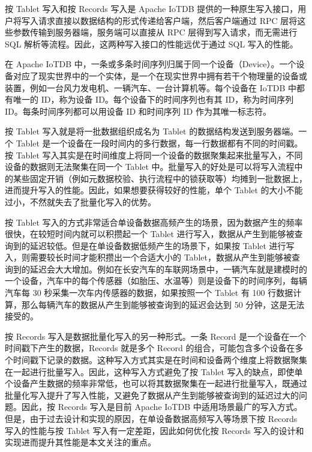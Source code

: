 按 Tablet 写入和按 Records 写入是 Apache IoTDB 提供的一种原生写入接口，用户将写入请求直接以数据结构的形式传递给客户端，然后客户端通过 RPC 层将这些参数传输到服务器端，服务端可以直接从 RPC 层得到写入请求，而无需进行 SQL 解析等流程。因此，这两种写入接口的性能远优于通过 SQL 写入的性能。

在 Apache IoTDB 中，一条或多条时间序列归属于同一个设备（Device）\cite{apache2024iotdbdevice}。一个设备对应了现实世界中的一个实体，是一个在现实世界中拥有若干个物理量的设备或装置，例如一台风力发电机、一辆汽车、一台计算机等。每个设备在 IoTDB 中都有唯一的 ID，称为设备 ID。每个设备下的时间序列也有其 ID，称为时间序列 ID。每条时间序列都可以用设备 ID 和时间序列 ID 作为其唯一标志符。

按 Tablet 写入就是将一批数据组织成名为 Tablet 的数据结构发送到服务器端。一个 Tablet 是一个设备在一段时间内的多行数据，每一行数据都有不同的时间戳。按 Tablet 写入其实是在时间维度上将同一个设备的数据聚集起来批量写入，不同设备的数据则无法聚集在同一个 Tablet 中。批量写入的好处是可以将写入流程中的某些固定开销（例如元数据校验、执行流程中的锁获取等）均摊到一批数据上，进而提升写入的性能。因此，如果想要获得较好的性能，单个 Tablet 的大小不能过小，不然就失去了批量化写入的优势。

按 Tablet 写入的方式非常适合单设备数据高频产生的场景，因为数据产生的频率很快，在较短时间内就可以积攒起一个 Tablet 进行写入，数据从产生到能够被查询到的延迟较低。但是在单设备数据低频产生的场景下，如果按 Tablet 进行写入，则需要较长时间才能积攒出一个合适大小的 Tablet，数据从产生到能够被查询到的延迟会大大增加。例如在长安汽车的车联网场景中，一辆汽车就是建模时的一个设备，汽车中的每个传感器（如胎压、水温等）则是设备下的时间序列，每辆汽车每 30 秒采集一次车内传感器的数据，如果按照一个 Tablet 有 100 行数据计算，那么每辆汽车的数据从产生到能够被查询到的延迟会达到 50 分钟，这是无法接受的。

按 Records 写入是数据批量化写入的另一种形式。一条 Record 是一个设备在一个时间戳下产生的数据，Records 就是多个 Record 的组合，可能包含多个设备在多个时间戳下记录的数据。这种写入方式其实是在时间和设备两个维度上将数据聚集在一起进行批量写入。因此，这种写入方式避免了按 Tablet 写入的缺点，即使单个设备产生数据的频率非常低，也可以将其数据聚集在一起进行批量写入，既通过批量化写入提升了写入性能，又避免了数据从产生到能够被查询到的延迟过大的问题。因此，按 Records 写入是目前 Apache IoTDB 中适用场景最广的写入方式。但是，由于过去设计和实现的原因，在单设备数据高频写入等场景下按 Records 写入的性能与按 Tablet 写入有一定差距，因此如何优化按 Records 写入的设计和实现进而提升其性能是本文关注的重点。


